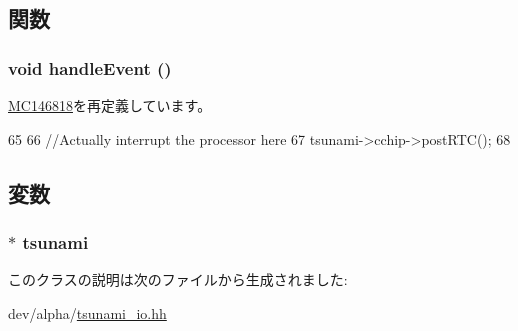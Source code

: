\subsection{関数}
\hypertarget{classTsunamiIO_1_1RTC_af592dd6aaf1c9c6af780a5cbc531417e}{
\subsubsection[{handleEvent}]{\setlength{\rightskip}{0pt plus 5cm}void handleEvent ()}}
\label{classTsunamiIO_1_1RTC_af592dd6aaf1c9c6af780a5cbc531417e}


\hyperlink{classMC146818_a30dfd044b822d58a6ff7335f815af8b1}{MC146818}を再定義しています。


\begin{DoxyCode}
65         {
66             //Actually interrupt the processor here
67             tsunami->cchip->postRTC();
68         }
\end{DoxyCode}


\subsection{変数}
\hypertarget{classTsunamiIO_1_1RTC_aa178467f241f875a068722413f62ec20}{
\subsubsection[{tsunami}]{$\ast$ {\bf tsunami}}}
\label{classTsunamiIO_1_1RTC_aa178467f241f875a068722413f62ec20}


このクラスの説明は次のファイルから生成されました:\begin{DoxyCompactItemize}
\item 
dev/alpha/\hyperlink{tsunami__io_8hh}{tsunami\_\-io.hh}\end{DoxyCompactItemize}
